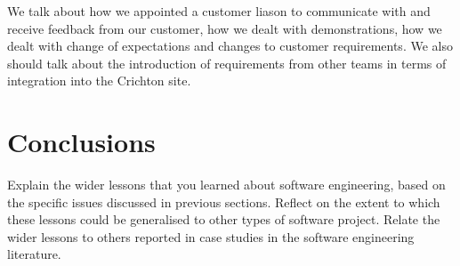 \documentclass{l3proj}
\begin{document}
We talk about how we appointed a customer liason to communicate with and receive feedback from our customer, how we dealt with
demonstrations, how we dealt with change of expectations and changes to customer requirements. We also should talk about the
introduction of requirements from other teams in terms of integration into the Crichton site.


\section{Conclusions}
\label{sec:conclusions}

Explain the wider lessons that you learned about software engineering,
based on the specific issues discussed in previous sections.  Reflect
on the extent to which these lessons could be generalised to other
types of software project.  Relate the wider lessons to others
reported in case studies in the software engineering literature.




\end{document}
